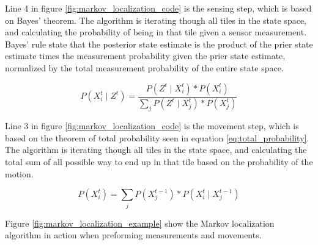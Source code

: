 
Line 4 in figure \ref{fig:markov_localization_code} is the sensing step, which is based on Bayes' theorem.
The algorithm is iterating though all tiles in the state space, and calculating the probability of being in that tile given a sensor measurement.
Bayes' rule state that the posterior state estimate is the product of the prier state estimate times the measurement probability given the prier state estimate, normalized by the total measurement probability of the entire state space.

\begin{equation}
\label{eq:Bayes_theorem}
P(X_{i}^{t} \mid Z^{t}) = \frac{P(Z^{t} \mid X_{i}^{t}) * P(X_{i}^{t})}{\sum_{j} P(Z^{t} \mid X_{j}^{t}) * P(X_{j}^{t})}
\end{equation}

Line 3 in figure \ref{fig:markov_localization_code} is the movement step, which is based on the theorem of total probability seen in equation \ref{eq:total_probability}.
The algorithm is iterating though all tiles in the state space, and calculating the total sum of all possible way to end up in that tile based on the probability of the motion.

\begin{equation}
\label{eq:total_probability}
P(X_{i}^{t}) = \sum_{j} P(X_{j}^{t-1}) * P(X_{i}^{t} \mid X_{j}^{t-1})
\end{equation}

\pagebreak

Figure \ref{fig:markov_localization_example} show the Markov localization algorithm in action when preforming measurements and movements.

